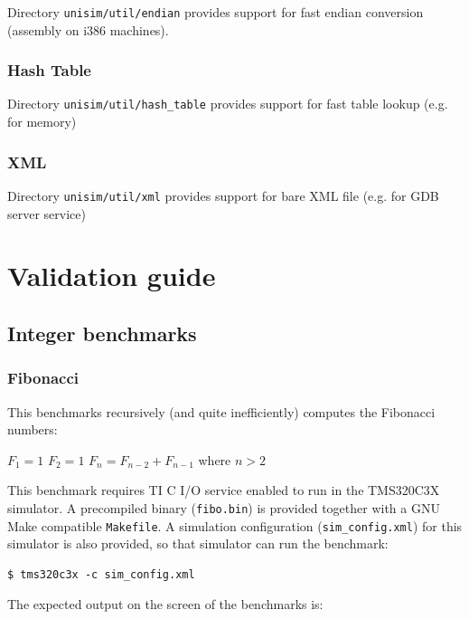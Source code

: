 Directory \texttt{unisim/util/endian} provides support for fast endian conversion (assembly on i386 machines).

\subsubsection{Hash Table}

Directory \texttt{unisim/util/hash\_table} provides support for fast table lookup (e.g. for memory)

\subsubsection{XML}

Directory \texttt{unisim/util/xml} provides support for bare XML file (e.g. for GDB server service)

\newpage
\section{Validation guide}

\subsection{Integer benchmarks}

\subsubsection{Fibonacci}

This benchmarks recursively (and quite inefficiently) computes the Fibonacci numbers:

\indent $F_1=1$
\newline
\indent $F_2=1$
\newline
\indent $F_n = F_{n - 2} + F_{n - 1}$ where $n > 2$
\newline

This benchmark requires TI C I/O service enabled to run in the TMS320C3X simulator.
A precompiled binary (\texttt{fibo.bin}) is provided together with a GNU Make compatible \texttt{Makefile}.
A simulation configuration (\texttt{sim\_config.xml}) for this simulator is also provided, so that simulator can run the benchmark:

\begin{verbatim}
$ tms320c3x -c sim_config.xml
\end{verbatim}

\noindent The expected output on the screen of the benchmarks is:

